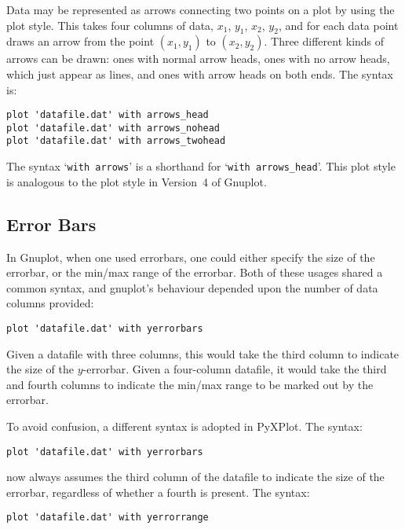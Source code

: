 Data may be represented as arrows connecting two points on a plot by using the
 plot style.  This takes four columns of data, $x_1$, $y_1$,
$x_2$, $y_2$, and for each data point draws an arrow from the point $(x_1,y_1)$
to $(x_2,y_2)$.  Three different kinds of arrows can be drawn: ones with normal
arrow heads, ones with no arrow heads, which just appear as lines, and ones
with arrow heads on both ends. The syntax is:

\begin{verbatim}
plot 'datafile.dat' with arrows_head
plot 'datafile.dat' with arrows_nohead
plot 'datafile.dat' with arrows_twohead
\end{verbatim}

The syntax `{\tt with arrows}' is a shorthand for `{\tt with arrows\_head}'.
This plot style is analogous to the  plot style in Version~4 of
Gnuplot.

\subsection{Error Bars}

\label{errorbars}
In Gnuplot, when one used errorbars, one could either specify the size of the
errorbar, or the min/max range of the errorbar. Both of these usages shared a
common syntax, and gnuplot's behaviour depended upon the number of data columns
provided:

\begin{verbatim}
plot 'datafile.dat' with yerrorbars
\end{verbatim}

\noindent Given a datafile with three columns, this would take the third column
to indicate the size of the $y$-errorbar. Given a four-column datafile, it
would take the third and fourth columns to indicate the min/max range to be
marked out by the errorbar.

To avoid confusion, a different syntax is adopted in PyXPlot. The syntax:

\begin{verbatim}
plot 'datafile.dat' with yerrorbars
\end{verbatim}

\noindent now always assumes the third column of the datafile to indicate the
size of the errorbar, regardless of whether a fourth is present. The syntax:

\begin{verbatim}
plot 'datafile.dat' with yerrorrange
\end{verbatim}

